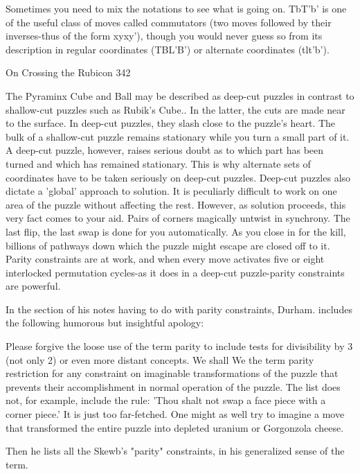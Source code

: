           Sometimes you need to mix the notations to see what is going on. TbT'b'
  is one of the useful class of moves called commutators (two moves followed by
  their inverses-thus of the form xyxy'), though you would never guess so from its
  description in regular coordinates (TBL'B') or alternate coordinates (tlt'b').




On Crossing the Rubicon                                                              342

           The Pyraminx Cube and Ball may be described as deep-cut puzzles in
   contrast to shallow-cut puzzles such as Rubik's Cube.. In the latter, the cuts are
   made near to the surface. In deep-cut puzzles, they slash close to the puzzle's
   heart. The bulk of a shallow-cut puzzle remains stationary while you turn a
   small part of it. A deep-cut puzzle, however, raises serious doubt as to which
   part has been turned and which has remained stationary. This is why alternate
   sets of coordinates have to be taken seriously on deep-cut puzzles.
           Deep-cut puzzles also dictate a 'global' approach to solution. It is
   peculiarly difficult to work on one area of the puzzle without affecting the rest.
   However, as solution proceeds, this very fact comes to your aid. Pairs of corners
   magically untwist in synchrony. The last flip, the last swap is done for you
   automatically. As you close in for the kill, billions of pathways down which the
   puzzle might escape are closed off to it. Parity constraints are at work, and when
   every move activates five or eight interlocked permutation cycles-as it does in a
   deep-cut puzzle-parity constraints are powerful.

       In the section of his notes having to do with parity constraints, Durham.
includes the following humorous but insightful apology:

   Please forgive the loose use of the term parity to include tests for divisibility by
   3 (not only 2) or even more distant concepts. We shall We the term parity
   restriction for any constraint on imaginable transformations of the puzzle that
   prevents their accomplishment in normal operation of the puzzle. The list does
   not, for example, include the rule: 'Thou shalt not swap a face piece with a
   corner piece.' It is just too far-fetched. One might as well try to imagine a move
   that transformed the entire puzzle into depleted uranium or Gorgonzola cheese.

Then he lists all the Skewb's "parity" constraints, in his generalized sense of the term.

